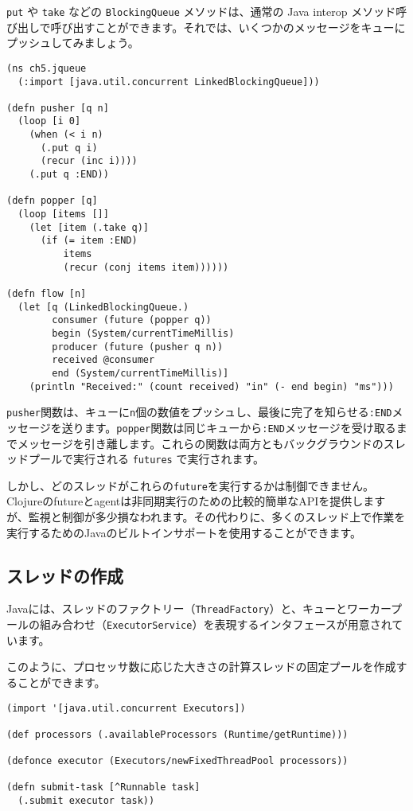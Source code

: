 \texttt{put} や \texttt{take} などの \texttt{BlockingQueue} メソッドは、通常の Java interop メソッド呼び出しで呼び出すことができます。それでは、いくつかのメッセージをキューにプッシュしてみましょう。

\begin{lstlisting}[numbers=none]
(ns ch5.jqueue
  (:import [java.util.concurrent LinkedBlockingQueue]))

(defn pusher [q n]
  (loop [i 0]
    (when (< i n)
      (.put q i)
      (recur (inc i))))
    (.put q :END))

(defn popper [q]
  (loop [items []]
    (let [item (.take q)]
      (if (= item :END)
          items
          (recur (conj items item))))))

(defn flow [n]
  (let [q (LinkedBlockingQueue.)
        consumer (future (popper q))
        begin (System/currentTimeMillis)
        producer (future (pusher q n))
        received @consumer
        end (System/currentTimeMillis)]
    (println "Received:" (count received) "in" (- end begin) "ms")))
\end{lstlisting}

\texttt{pusher}関数は、キューに\texttt{n}個の数値をプッシュし、最後に完了を知らせる\texttt{:END}メッセージを送ります。\texttt{popper}関数は同じキューから\texttt{:END}メッセージを受け取るまでメッセージを引き離します。これらの関数は両方ともバックグラウンドのスレッドプールで実行される \texttt{futures} で実行されます。

しかし、どのスレッドがこれらの\texttt{future}を実行するかは制御できません。Clojureのfutureとagentは非同期実行のための比較的簡単なAPIを提供しますが、監視と制御が多少損なわれます。その代わりに、多くのスレッド上で作業を実行するためのJavaのビルトインサポートを使用することができます。

\subsection{スレッドの作成}

Javaには、スレッドのファクトリー（\texttt{ThreadFactory}）と、キューとワーカープールの組み合わせ（\texttt{ExecutorService}）を表現するインタフェースが用意されています。

このように、プロセッサ数に応じた大きさの計算スレッドの固定プールを作成することができます。


\begin{lstlisting}[numbers=none]
(import '[java.util.concurrent Executors])

(def processors (.availableProcessors (Runtime/getRuntime)))

(defonce executor (Executors/newFixedThreadPool processors))

(defn submit-task [^Runnable task]
  (.submit executor task))
\end{lstlisting}

